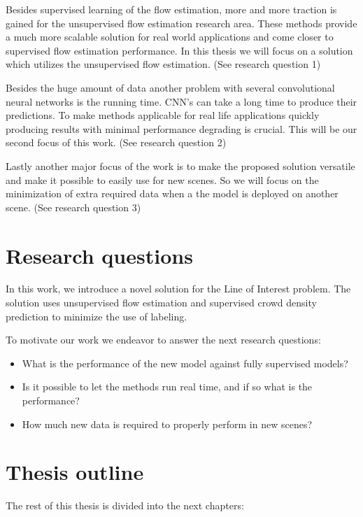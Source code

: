 Besides supervised learning of the flow estimation, more and more traction is gained for the unsupervised flow estimation research area. These methods provide a much more scalable solution for real world applications and come closer to supervised flow estimation performance. In this thesis we will focus on a solution which utilizes the unsupervised flow estimation. (See research question 1)

Besides the huge amount of data another problem with several convolutional neural networks is the running time. CNN’s can take a long time to produce their predictions. To make methods applicable for real life applications quickly producing results with minimal performance degrading is crucial. This will be our second focus of this work. (See research question 2)

Lastly another major focus of the work is to make the proposed solution versatile and make it possible to easily use for new scenes. So we will focus on the minimization of extra required data when a the model is deployed on another scene. (See research question 3)

\section{Research questions}
In this work, we introduce a novel solution for the Line of Interest problem. The solution uses unsupervised flow estimation and supervised crowd density prediction to minimize the use of labeling.

To motivate our work we endeavor to answer the next research questions:
\begin{itemize}
    \item What is the performance of the new model against fully supervised models?
    \item Is it possible to let the methods run real time, and if so what is the performance?
    \item How much new data is required to properly perform in new scenes?
\end{itemize}



\section{Thesis outline}
The rest of this thesis is divided into the next chapters:


